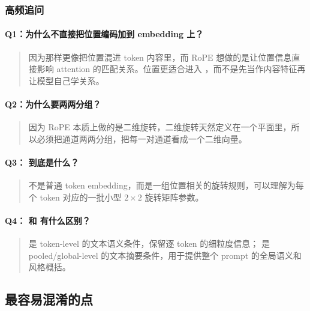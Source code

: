 \subsubsection*{高频追问}

\paragraph{Q1：为什么不直接把位置编码加到 embedding 上？}

\begin{quote}
因为那样更像把位置混进 token 内容里，而 RoPE 想做的是让位置信息直接影响 attention 的匹配关系。位置更适合进入 ，而不是先当作内容特征再让模型自己学关系。
\end{quote}

\paragraph{Q2：为什么要两两分组？}

\begin{quote}
因为 RoPE 本质上做的是二维旋转，二维旋转天然定义在一个平面里，所以必须把通道两两分组，把每一对通道看成一个二维向量。
\end{quote}

\paragraph{Q3： 到底是什么？}

\begin{quote}
 不是普通 token embedding，而是一组位置相关的旋转规则，可以理解为每个 token 对应的一批小型 $2 \times 2$ 旋转矩阵参数。
\end{quote}

\paragraph{Q4： 和  有什么区别？}

\begin{quote}
 是 token-level 的文本语义条件，保留逐 token 的细粒度信息； 是 pooled/global-level 的文本摘要条件，用于提供整个 prompt 的全局语义和风格概括。
\end{quote}

\subsection{最容易混淆的点}

